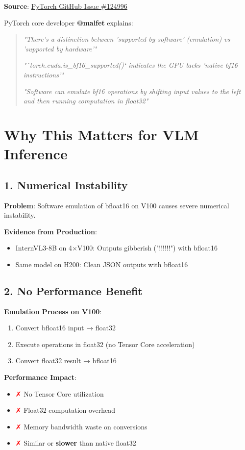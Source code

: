 \documentclass[11pt,a4paper]{article}
\newcommand{\xmark}{\textcolor{red}{✗}}
\begin{document}
\textbf{Source}: \href{https://github.com/pytorch/pytorch/issues/124996}{PyTorch GitHub Issue \#124996}

PyTorch core developer \textbf{@malfet} explains:

\begin{quote}
\textit{"There's a distinction between 'supported by software' (emulation) vs 'supported by hardware'"}

\textit{"`torch.cuda.is\_bf16\_supported()` indicates the GPU lacks 'native bf16 instructions'"}

\textit{"Software can emulate bf16 operations by shifting input values to the left and then running computation in float32"}
\end{quote}

\section{Why This Matters for VLM Inference}

\subsection{1. Numerical Instability}

\textbf{Problem}: Software emulation of bfloat16 on V100 causes severe numerical instability.

\textbf{Evidence from Production}:
\begin{itemize}[leftmargin=*]
    \item InternVL3-8B on 4×V100: Outputs gibberish ("!!!!!!") with bfloat16
    \item Same model on H200: Clean JSON outputs with bfloat16
\end{itemize}

\subsection{2. No Performance Benefit}

\textbf{Emulation Process on V100}:
\begin{enumerate}[leftmargin=*]
    \item Convert bfloat16 input → float32
    \item Execute operations in float32 (no Tensor Core acceleration)
    \item Convert float32 result → bfloat16
\end{enumerate}

\textbf{Performance Impact}:
\begin{itemize}[leftmargin=*]
    \item \xmark{} No Tensor Core utilization
    \item \xmark{} Float32 computation overhead
    \item \xmark{} Memory bandwidth waste on conversions
    \item \xmark{} Similar or \textbf{slower} than native float32
\end{itemize}
\end{document}
